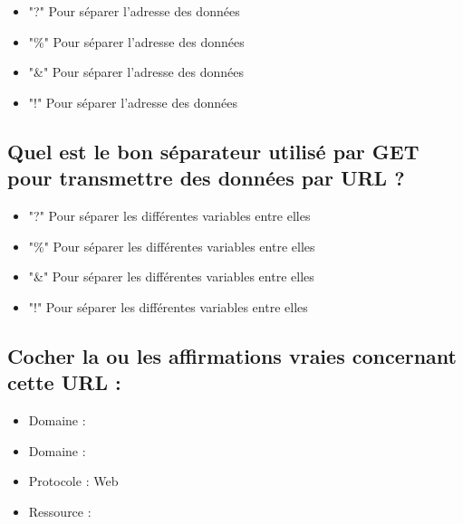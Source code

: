 \documentclass[11pt,a4paper]{article}
\begin{document}
\begin{itemize}
\item[\CaseCoche] "?" Pour séparer l'adresse des données \\  %
\item[\CaseCoche] "\%" Pour séparer l'adresse des données \\
\item[\CaseCoche] "\&" Pour séparer l'adresse des données \\
\item[\CaseCoche] "!" Pour séparer l'adresse des données \\
\end{itemize}


\subsection{Quel est le bon séparateur utilisé par GET pour transmettre des données par URL ?}

\begin{itemize}
\item[\CaseCoche] "?" Pour séparer les différentes variables entre elles \\
\item[\CaseCoche] "\%" Pour séparer les différentes variables entre elles \\
\item[\CaseCoche] "\&" Pour séparer les différentes variables entre elles \\  %
\item[\CaseCoche] "!" Pour séparer les différentes variables entre elles \\
\end{itemize}


\subsection{Cocher la ou les affirmations vraies concernant cette URL :}


\bigskip

\begin{itemize}
\item[\CaseCoche] Domaine :  \\
\item[\CaseCoche] Domaine :  \\
\item[\CaseCoche] Protocole : Web \\  %
\item[\CaseCoche] Ressource :  \\
\end{itemize}
\end{document}
